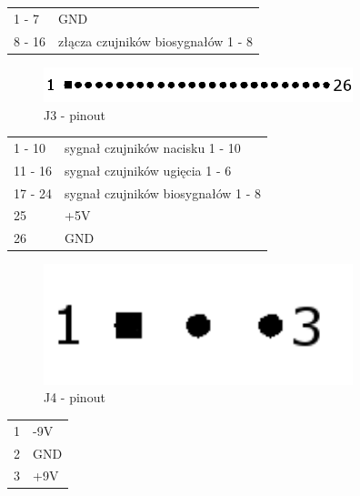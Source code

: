 \documentclass{article}
\begin{document}
\begin{table}[H]
	\centering
	\label{J2 - pinout}
	\begin{tabular}{ll}
	1 - 7		&	GND					\\
	8 - 16		&	złącza czujników biosygnałów 1 - 8	\\
\end{tabular}
\end{table}

\begin{figure}[H]
	\centering
	\includegraphics[width=9cm]{J3.png}
	\caption{J3 - pinout}
	\label{rys:J3 - pinout}
\end{figure}

\begin{table}[H]
	\centering
	\label{J3 - pinout}
	\begin{tabular}{ll}
	1 - 10		&	sygnał czujników nacisku 1 - 10		\\
	11 - 16		&	sygnał czujników ugięcia 1 - 6		\\
	17 - 24		&	sygnał czujników biosygnałów 1 - 8	\\
	25		&	+5V					\\
	26		&	GND					\\
\end{tabular}
\end{table}

\begin{figure}[H]
	\centering
	\includegraphics[width=9cm]{J4.png}
	\caption{J4 - pinout}
	\label{rys:J4 - pinout}
\end{figure}

\begin{table}[H]
	\centering
	\label{J4 - pinout}
	\begin{tabular}{ll}
	1 		&	-9V					\\
	2		&	GND					\\
	3		&	+9V					\\
\end{tabular}
\end{table}
\end{document}
